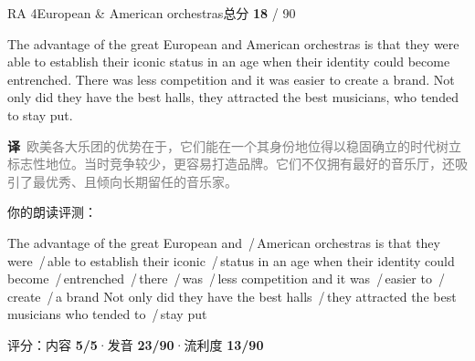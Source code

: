 \documentclass[11pt]{article}
\newcommand{\sfull}[1]{\textcolor{cFix}{\bfseries #1}}     %
\newcommand{\spart}[1]{\textcolor{cPartial}{\bfseries #1}} %
\newcommand{\szero}[1]{\textcolor{cWrong}{\bfseries #1}}   %
\newcommand{\sg}[1]{\textcolor{cSpkGood}{#1}}   %
\newcommand{\sy}[1]{\textcolor{cSpkOk}{#1}}     %
\newcommand{\sr}[1]{\textcolor{cSpkBad}{#1}}    %
\newcommand{\pse}{{\color{gray}\,/\,}}          %
\newcommand{\zh}[1]{{\footnotesize\textcolor{cNote}{\textbf{译}}\ \textcolor{gray}{#1}}}
\begin{document}
\begin{qblock}{RA 4\quad European \& American orchestras}{总分 \textcolor{cAccent}{\bfseries 18} / 90}
\begin{promptbox}
The advantage of the great European and American orchestras is that they were able to establish their iconic status in an age when their identity could become entrenched. There was less competition and it was easier to create a brand. Not only did they have the best halls, they attracted the best musicians, who tended to stay put.
\end{promptbox}
\zh{欧美各大乐团的优势在于，它们能在一个其身份地位得以稳固确立的时代树立标志性地位。当时竞争较少，更容易打造品牌。它们不仅拥有最好的音乐厅，还吸引了最优秀、且倾向长期留任的音乐家。}
\smallskip\par{\footnotesize\color{gray}你的朗读评测：}
\begin{asrbox}
\sg{The advantage} \sg{of the great} \sy{European} \sy{and} \pse \sy{American orchestras} \sg{is that they were} \pse \sg{able to establish their} \sy{iconic} \pse \sg{status in an age when their identity could become} \pse \sr{entrenched} \pse \sy{there} \pse \sy{was} \pse \sy{less competition} \sg{and it} \sg{was} \pse \sg{easier to} \pse \sy{create} \pse \sy{a brand} \sg{Not only did they} \sg{have the best halls} \pse \sy{they} \sr{attracted} \sg{the best musicians who} \sg{tended to} \pse \sg{stay put}
\end{asrbox}
{\small 评分：内容 \sfull{5/5}\quad·\quad 发音 \spart{23/90}\quad·\quad 流利度 \szero{13/90}}
\end{qblock}
\end{document}
